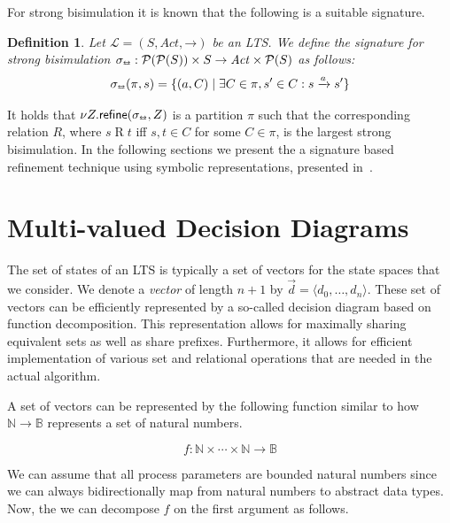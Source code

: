 \documentclass[a4paper]{article}
\newcommand{\partition}{\pi}
\newcommand{\signature}{\sigma}
\newcommand{\lts}{\mathcal{L}}
\newcommand{\states}{S}
\newcommand{\actions}{\mathit{Act}}
\newcommand{\transitions}{\mathbin{\rightarrow}}
\newcommand{\transition}[1]{\xrightarrow{#1}}
\newcommand{\bisim}{\mathbin{\leftrightarroweq}}
\newcommand{\related}{\mathbin{R}}
\newcommand{\set}[1]{\mathcal{P}(#1)}
\newcommand{\refine}{\textsf{refine}}
\renewcommand{\vector}[1]{\langle #1 \rangle}
\newcommand{\nats}{\mathbb{N}}
\newcommand{\booleans}{\mathbb{B}}
\newtheorem{definition}[theorem]{Definition}
\begin{document}
For strong bisimulation it is known that the following is a suitable signature.

\begin{definition}
  Let $\lts = (\states, \actions, \transitions)$ be an LTS.
  We define the signature for strong bisimulation $\signature_{\bisim} : \set{\set{\states}} \times \states \rightarrow \actions \times \set{\states}$ as follows:
  \begin{equation*}
    \signature_{\bisim}(\partition, s) =  \{ (a, C) \mid \exists C \in \partition, s' \in C: s \transition{a} s' \}
  \end{equation*}
\end{definition}

It holds that $\nu Z . \refine(\signature_{\bisim}, Z)$ is a partition $\partition$ such that the corresponding relation $\related$, where $s \related t$ iff $s, t \in C$ for some $C \in \partition$, is the largest strong bisimulation.
In the following sections we present the a signature based refinement technique using symbolic representations, presented in~\cite{DijkP18}.  

\section{Multi-valued Decision Diagrams}

The set of states of an LTS is typically a set of vectors for the state spaces that we consider.
We denote a \emph{vector} of length $n+1$ by $\vec{d} = \vector{d_0, \ldots, d_n}$.
These set of vectors can be efficiently represented by a so-called decision diagram based on function decomposition.
This representation allows for maximally sharing equivalent sets as well as share prefixes.
Furthermore, it allows for efficient implementation of various set and relational operations that are needed in the actual algorithm.

A set of vectors can be represented by the following function similar to how $\nats \rightarrow \booleans$ represents a set of natural numbers.

\begin{equation*}
  f: \nats \times \cdots \times \nats \rightarrow \booleans
\end{equation*}

We can assume that all process parameters are bounded natural numbers since we can always bidirectionally map from natural numbers to abstract data types.
Now, the we can decompose $f$ on the first argument as follows.
\end{document}
